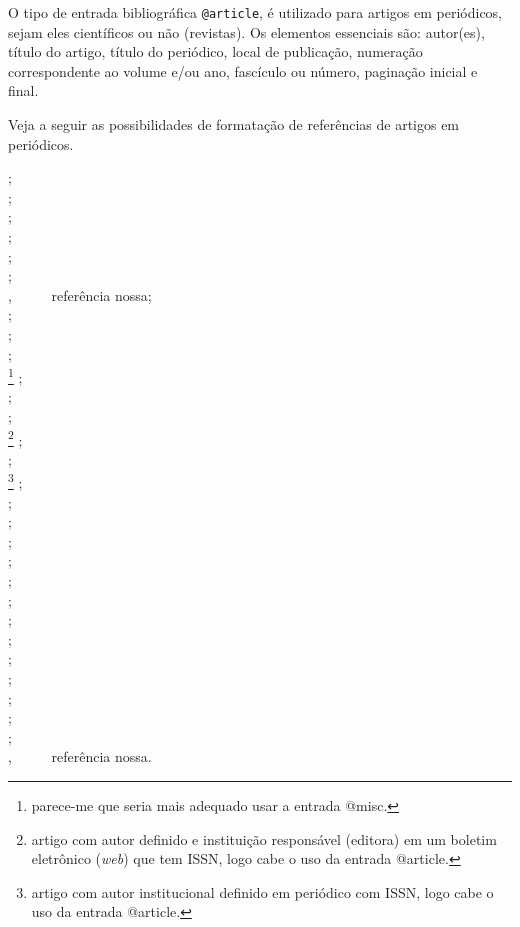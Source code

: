 \begin{apendicesenv}
O tipo de entrada bibliográfica \verb|@article|, é utilizado para artigos em periódicos, sejam eles científicos ou não (revistas). Os elementos essenciais são: autor(es), título do artigo, título do periódico, local de publicação, numeração correspondente ao volume e/ou ano, fascículo ou número, paginação inicial e final.

Veja a seguir as possibilidades de formatação de referências de artigos em periódicos.

{\small
	\cite{Alcarde1996} ;\\
	\cite{barros1995} ;\\
	\cite{benetton1993} ;\\
	\cite{brasil1966} ;\\ 
	\cite{brasil1999} ;\\
	\cite{brasillex1998} ;\\  
	\cite{Carvalho2001} , \ \ \ \ \ referência nossa;\\
	\cite{Chakrabarti2006} ;\\
	\cite{Cost1998} ;\\
	\cite{figueirde1996} ;\\
	\cite{fraipont1998}\footnote{parece-me que seria mais adequado usar a entrada {\ttfamily @misc}.} ;\\
	\cite{gsilva1998} ;\\
	\cite{gurgel1997} ;\\
	\cite{kelly1996}\footnote{artigo com autor definido e instituição responsável (editora) em um boletim eletrônico (\textit{web}) que tem ISSN, logo cabe o uso da entrada {\ttfamily @article}.} ;\\
	\cite{leal1999} ;\\
	\cite{leis1991}\footnote{artigo com autor institucional definido em periódico com ISSN, logo cabe o uso da entrada {\ttfamily @article}.} ;\\
	\cite{leitao1989} ;\\
	\cite{lex1943} ;\\
	\cite{lex1998} ;\\
	\cite{lion1981} ;\\
	\cite{mansilla1998} ;\\
	\cite{marins1991} ;\\
	\cite{naves1999} ;\\
	\cite{nordeste1998} ;\\
	\cite{pc1998} ;\\
	\cite{ribeiro1998} ;\\
	\cite{silva1988} ;\\
	\cite{silva1998} ;\\
	\cite{tourinho1997} ;\\
	\cite{vanGELDER1998} , \ \ \ \ \ referência nossa.\\
}




\end{apendicesenv}
